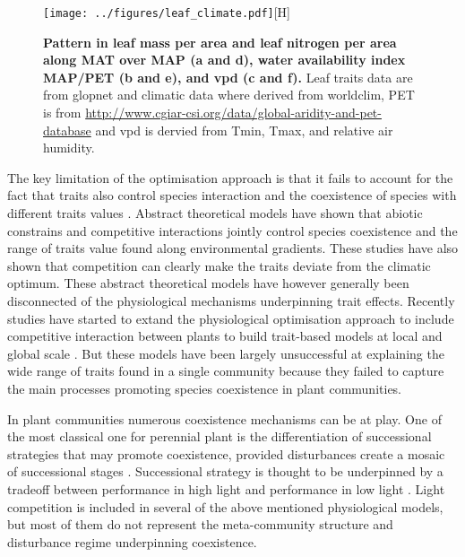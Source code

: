 \documentclass[a4paper,11pt]{article}
\begin{document}
\begin{figure}[ht]
\centering
\texttt{[image: ../figures/leaf\_climate.pdf]}[H]
\caption{\textbf{Pattern in leaf mass per area and leaf nitrogen per
  area along MAT over MAP (a and d), water availability index
  MAP/PET (b and e), and  vpd (c and f).} Leaf traits data are from glopnet
\citep{Wright-2004} and climatic data where derived from worldclim,
PET is from
\url{http://www.cgiar-csi.org/data/global-aridity-and-pet-database}
and vpd is dervied from Tmin, Tmax, and relative air humidity.
\label{fig:leafpattern}}
\end{figure}


The key limitation of the optimisation approach is that it fails to account for the fact that
traits also control species interaction and the coexistence of
species with different traits values \citep{Chesson-2018}. 
Abstract theoretical models \citep{Case-2000,Goldberg-2006,Leimar-2008} have shown that abiotic constrains and competitive interactions jointly control species coexistence and the range of traits
value found along environmental gradients. These studies have also shown that competition can
clearly make the traits deviate from the climatic optimum. These
abstract theoretical models have however generally been disconnected
of the physiological mechanisms underpinning trait effects. Recently studies have started to extand the physiological optimisation
approach to include competitive interaction between plants to build trait-based models at local \citep{Farrior-2013} and global
scale \citep[see][]{Sakschewski-2015,Scheiter-2013}. But these models
have been largely unsuccessful at explaining the wide range of traits
found in a single community because they failed to capture the main
processes promoting species coexistence in plant communities.

In plant communities numerous coexistence mechanisms can be at
play. One of the most classical one for perennial plant is the
differentiation of successional strategies that may promote
coexistence, provided disturbances create a mosaic of successional
stages \citep{Falster-2017}. Successional strategy is thought to be underpinned by a tradeoff
between performance in high light and performance in low light \citep{Pacala-1996}. Light
competition is included in several of the above mentioned
physiological models, but most of them do not represent the
meta-community structure and disturbance regime underpinning coexistence.
\end{document}
